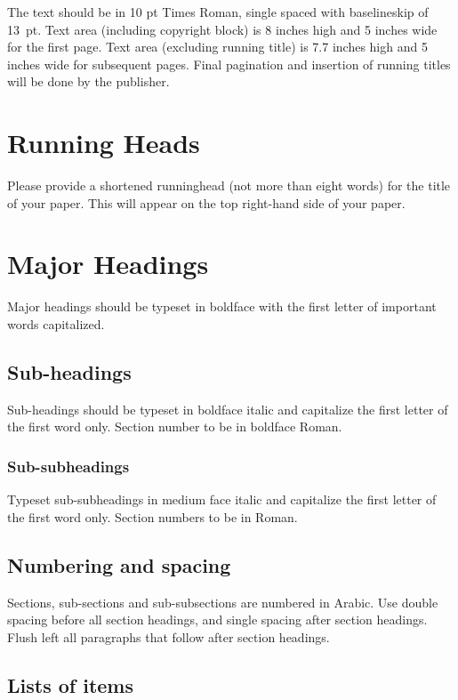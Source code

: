 \documentclass{ws-mpla}
\begin{document}
The text should be in 10 pt Times Roman, single spaced with
baselineskip of 13~pt. Text area (including copyright block)
is 8 inches high and 5 inches wide for the first page.
Text area (excluding running title) is 7.7 inches high and
5 inches wide for subsequent pages.  Final pagination and
insertion of running titles will be done by the publisher.

\section{Running Heads}

Please provide a shortened runninghead (not more than eight words) for
the title of your paper. This will appear on the top right-hand side
of your paper.

\section{Major Headings}

Major headings should be typeset in boldface with the first
letter of important words capitalized.

\subsection{Sub-headings}

Sub-headings should be typeset in boldface italic and capitalize
the first letter of the first word only. Section number to be in
boldface Roman.

\subsubsection{Sub-subheadings}

Typeset sub-subheadings in medium face italic and capitalize the
first letter of the first word only. Section numbers to be in Roman.

\subsection{Numbering and spacing}

Sections, sub-sections and sub-subsections are numbered in
Arabic.  Use double spacing before all section headings, and
single spacing after section headings. Flush left all paragraphs
that follow after section headings.

\subsection{Lists of items}
\end{document}

